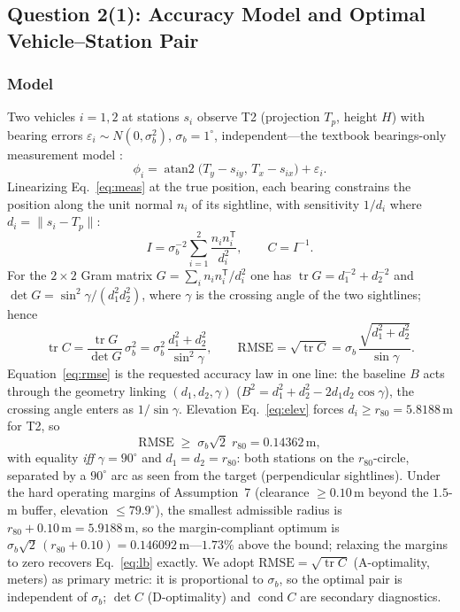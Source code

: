 \subsection{Question 2(1): Accuracy Model and Optimal Vehicle--Station Pair}\label{sec:q21}

\subsubsection{Model}

Two vehicles $i=1,2$ at stations $s_i$ observe T2 (projection $T_p$, height $H$) with
bearing errors $\varepsilon_i\sim N(0,\sigma_b^2)$, $\sigma_b=1^\circ$, independent---the
textbook bearings-only measurement model \cite{torrieri1984,kay1993}:
\begin{equation}\label{eq:meas}
\phi_i=\operatorname{atan2}\bigl(T_y-s_{iy},\,T_x-s_{ix}\bigr)+\varepsilon_i .
\end{equation}
Linearizing Eq.~\eqref{eq:meas} at the true position, each bearing constrains the
position along the unit normal $n_i$ of its sightline, with sensitivity $1/d_i$ where
$d_i=\|s_i-T_p\|$:
\begin{equation}\label{eq:fisher}
I=\sigma_b^{-2}\sum_{i=1}^{2}\frac{n_i n_i^{\mathsf T}}{d_i^{2}},\qquad
C=I^{-1} .
\end{equation}
For the $2\times2$ Gram matrix $G=\sum_i n_i n_i^{\mathsf T}/d_i^2$ one has
$\operatorname{tr}G=d_1^{-2}+d_2^{-2}$ and $\det G=\sin^2\gamma/(d_1^2d_2^2)$, where
$\gamma$ is the crossing angle of the two sightlines; hence
\begin{equation}\label{eq:rmse}
\operatorname{tr}C=\frac{\operatorname{tr}G}{\det G}\,\sigma_b^{2}
=\sigma_b^{2}\,\frac{d_1^{2}+d_2^{2}}{\sin^{2}\gamma},
\qquad
\mathrm{RMSE}=\sqrt{\operatorname{tr}C}
=\sigma_b\,\frac{\sqrt{d_1^{2}+d_2^{2}}}{\sin\gamma}.
\end{equation}
Equation~\eqref{eq:rmse} is the requested accuracy law in one line: the baseline $B$
acts through the geometry linking $(d_1,d_2,\gamma)$
($B^2=d_1^2+d_2^2-2d_1d_2\cos\gamma$), the crossing angle enters as $1/\sin\gamma$.
Elevation Eq.~\eqref{eq:elev} forces $d_i\ge r_{80}=5.8188\,\mathrm{m}$ for T2, so
\begin{equation}\label{eq:lb}
\mathrm{RMSE}\;\ge\;\sigma_b\sqrt{2}\;r_{80}=0.14362\,\mathrm{m},
\end{equation}
with equality \emph{iff} $\gamma=90^\circ$ and $d_1=d_2=r_{80}$: both stations on the
$r_{80}$-circle, separated by a $90^\circ$ arc as seen from the target (perpendicular
sightlines). Under the hard operating margins of Assumption~7 (clearance
$\ge0.10\,\mathrm{m}$ beyond the $1.5$-m buffer, elevation $\le79.9^\circ$), the
smallest admissible radius is $r_{80}+0.10\,\mathrm{m}=5.9188\,\mathrm{m}$, so the
margin-compliant optimum is
$\sigma_b\sqrt2\,(r_{80}+0.10)=0.146092\,\mathrm{m}$---$1.73\%$ above the bound;
relaxing the margins to zero recovers Eq.~\eqref{eq:lb} exactly. We adopt
$\mathrm{RMSE}=\sqrt{\operatorname{tr}C}$ (A-optimality, meters) as primary metric: it
is proportional to $\sigma_b$, so the optimal pair is independent of $\sigma_b$;
$\det C$ (D-optimality) and $\operatorname{cond}C$ are secondary diagnostics.


